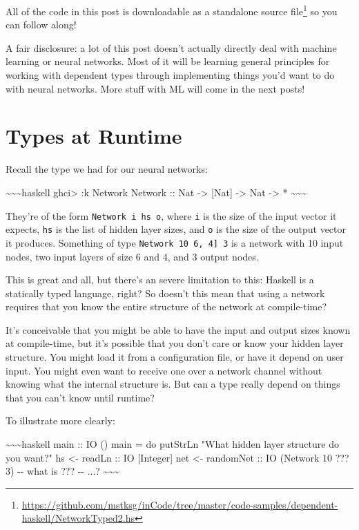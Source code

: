 \documentclass[]{article}
\renewcommand{\href}[2]{#2\footnote{\url{#1}}}
\begin{document}
All of the code in this post is
\href{https://github.com/mstksg/inCode/tree/master/code-samples/dependent-haskell/NetworkTyped2.hs}{downloadable
as a standalone source file} so you can follow along!

A fair disclosure: a lot of this post doesn't actually directly deal with
machine learning or neural networks. Most of it will be learning general
principles for working with dependent types through implementing things you'd
want to do with neural networks. More stuff with ML will come in the next posts!

\section{Types at Runtime}

Recall the type we had for our neural networks:

\textasciitilde{}\textasciitilde{}\textasciitilde{}haskell ghci\textgreater{} :k
Network Network :: Nat -\textgreater{} {[}Nat{]} -\textgreater{} Nat
-\textgreater{} * \textasciitilde{}\textasciitilde{}\textasciitilde{}

They're of the form \texttt{Network\ i\ hs\ o}, where \texttt{i} is the size of
the input vector it expects, \texttt{hs} is the list of hidden layer sizes, and
\texttt{o} is the size of the output vector it produces. Something of type
\texttt{Network\ 10\ \textquotesingle{}{[}6,\ 4{]}\ 3} is a network with 10
input nodes, two input layers of size 6 and 4, and 3 output nodes.

This is great and all, but there's an severe limitation to this: Haskell is a
statically typed language, right? So doesn't this mean that using a network
requires that you know the entire structure of the network at compile-time?

It's conceivable that you might be able to have the input and output sizes known
at compile-time, but it's possible that you don't care or know your hidden layer
structure. You might load it from a configuration file, or have it depend on
user input. You might even want to receive one over a network channel without
knowing what the internal structure is. But can a type really depend on things
that you can't know until runtime?

To illustrate more clearly:

\textasciitilde{}\textasciitilde{}\textasciitilde{}haskell main :: IO () main =
do putStrLn "What hidden layer structure do you want?" hs \textless{}- readLn ::
IO {[}Integer{]} net \textless{}- randomNet :: IO (Network 10 ??? 3) -\/- what
is ??? -\/- ...? \textasciitilde{}\textasciitilde{}\textasciitilde{}
\end{document}
